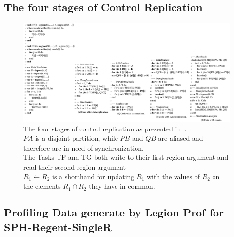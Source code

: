 \documentclass{article}      %
\begin{document}
\begin{appendices}
	\newpage

		\begin{landscape}
			\section{The four stages of Control Replication}
			\label{app:control_replication}
			\pagestyle{empty}%

			\begin{figure}[H]
				\includegraphics[width=0.90\linewidth]{images/control_replication}
				\caption*{The four stages of control replication as presented in~\cite{Slaughter2017}. \\ $PA$ is a disjoint partition, while $PB$ and $QB$ are aliased and therefore are in need of synchronization.\\ The Tasks TF and TG both write to their first region argument and read their second region argument \\
				$R_1 \leftarrow R_2$ is a shorthand for updating $R_1$ with the values of $R_2$ on the elements $R_1 \cap R_2$ they have in common.}
			\end{figure}

		\end{landscape}

		\newpage

		\begin{landscape}
			\section{Profiling Data generate by Legion Prof for SPH-Regent-SingleR}
			\label{app:SPH-Regent-SingleR-Prof}
			\pagestyle{empty}%


\end{landscape}
\end{appendices}
\end{document}

